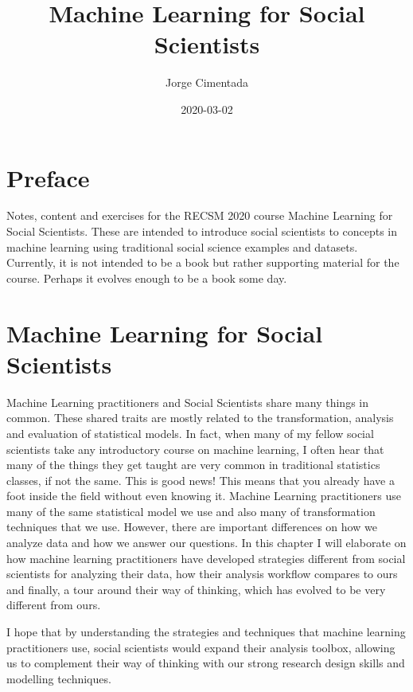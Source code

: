 \documentclass[
]{book}
\title{Machine Learning for Social Scientists}
\author{Jorge Cimentada}
\date{2020-03-02}
\begin{document}
\frontmatter
\maketitle

{
\setcounter{tocdepth}{1}
\tableofcontents
}
\mainmatter
\hypertarget{preface}{%
\chapter*{Preface}\label{preface}}

Notes, content and exercises for the RECSM 2020 course Machine Learning for Social Scientists. These are intended to introduce social scientists to concepts in machine learning using traditional social science examples and datasets. Currently, it is not intended to be a book but rather supporting material for the course. Perhaps it evolves enough to be a book some day.

\hypertarget{machine-learning-for-social-scientists}{%
\chapter{Machine Learning for Social Scientists}\label{machine-learning-for-social-scientists}}

Machine Learning practitioners and Social Scientists share many things in common. These shared traits are mostly related to the transformation, analysis and evaluation of statistical models. In fact, when many of my fellow social scientists take any introductory course on machine learning, I often hear that many of the things they get taught are very common in traditional statistics classes, if not the same. This is good news! This means that you already have a foot inside the field without even knowing it. Machine Learning practitioners use many of the same statistical model we use and also many of transformation techniques that we use. However, there are important differences on how we analyze data and how we answer our questions. In this chapter I will elaborate on how machine learning practitioners have developed strategies different from social scientists for analyzing their data, how their analysis workflow compares to ours and finally, a tour around their way of thinking, which has evolved to be very different from ours.

I hope that by understanding the strategies and techniques that machine learning practitioners use, social scientists would expand their analysis toolbox, allowing us to complement their way of thinking with our strong research design skills and modelling techniques.
\end{document}
